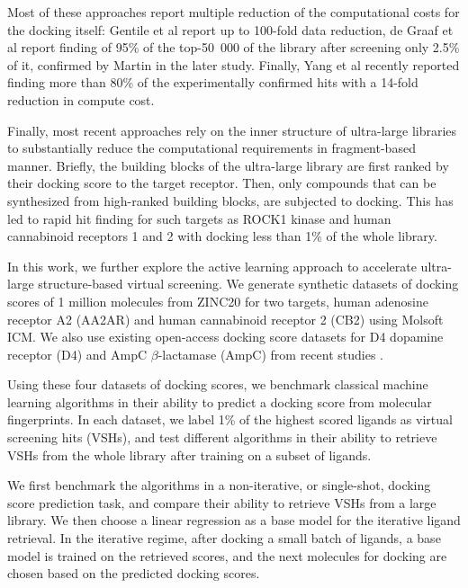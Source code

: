 Most of these approaches report multiple reduction of the computational costs for the docking itself: Gentile et al report up to 100-fold data reduction, de Graaf et al report finding of 95\% of the top-50\ 000 of the library after screening only 2.5\% of it, confirmed by Martin \cite{logistic_regression} in the later study. Finally, Yang et al \cite{Yang2021_shoichet_active_learning} recently reported finding more than 80\% of the experimentally confirmed hits with a 14-fold reduction in compute cost.

Finally, most recent approaches \cite{Sadybekov2021_vsynthes,beroza_chemical_2022} rely on the inner structure of ultra-large libraries to substantially reduce the computational requirements in fragment-based manner. Briefly, the building blocks of the ultra-large library are first ranked by their docking score to the target receptor. Then, only compounds that can be synthesized from high-ranked building blocks, are subjected to docking. This has led to rapid hit finding for such targets as ROCK1 kinase and human cannabinoid receptors 1 and 2 with docking less than 1\% of the whole library.

In this work, we further explore the active learning approach to accelerate ultra-large structure-based virtual screening. We generate synthetic datasets of docking scores of 1 million molecules from ZINC20 \cite{Irwin2020ZINC20Discovery} for two targets, human adenosine receptor A2 (AA2AR) and human cannabinoid receptor 2 (CB2) using Molsoft ICM. We also use existing open-access docking score datasets for D4 dopamine receptor (D4) and AmpC $\beta$-lactamase (AmpC) from recent studies \cite{ultralarge_docking_first}. 

Using these four datasets of docking scores, we benchmark classical machine learning algorithms in their ability to predict a docking score from molecular fingerprints. In each dataset, we label 1\% of the highest scored ligands as virtual screening hits (VSHs), and test different algorithms in their ability to retrieve VSHs from the whole library after training on a subset of ligands.

We first benchmark the algorithms in a non-iterative, or single-shot, docking score prediction task, and compare their ability to retrieve VSHs from a large library. We then choose a linear regression as a base model for the iterative ligand retrieval. In the iterative regime, after docking a small batch of ligands, a base model is trained on the retrieved scores, and the next molecules for docking are chosen based on the predicted docking scores.

